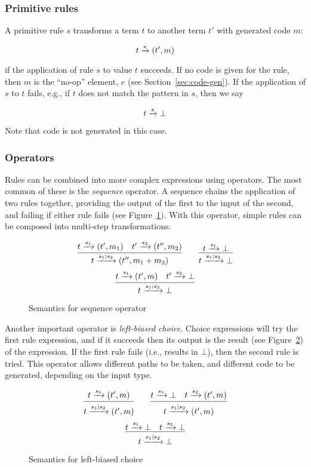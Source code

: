 \subsubsection{Primitive rules}

A primitive rule $s$ transforms a term $t$ to another term $t'$ with generated code $m$:

\[
t \xrightarrow{s} (t',m)
\]

if the application of rule $s$ to value $t$ succeeds. If no code is given for the rule, then $m$ is the ``no-op'' element, $e$ (see Section~\ref{sec:code-gen}). If the application of $s$ to $t$ fails, e.g., if $t$ does not match the pattern in $s$, then we say

\[
t \xrightarrow{s} \bot
\]

Note that code is not generated in this case.

\subsubsection{Operators}

Rules can be combined into more complex expressions using operators. The most common of these is the \emph{sequence} operator. A sequence chains the application of two rules together, providing the output of the first to the input of the second, and failing if either rule fails (see Figure~\ref{semantics:sequence}). With this operator, simple rules can be composed into multi-step transformations.

\begin{figure}[ht]
\[
\infer{t \arr{s_1;s_2} (t'',m_1+m_2)}{t \arr{s_1} (t',m_1) \quad t' \arr{s_2} (t'',m_2)}
\qquad 
\infer{t \arr{s_1;s_2} \bot}{t \arr{s_1} \bot}
\]
\[
\infer{t \arr{s_1;s_2} \bot}{t \arr{s_1} (t',m) \quad t' \arr{s_2} \bot}
\]
\caption{Semantics for sequence operator}
\label{semantics:sequence}
\end{figure}

Another important operator is \emph{left-biased choice}. Choice expressions will try the first rule expression, and if it succeeds then its output is the result (see Figure~\ref{semantics:choice}) of the expression. If the first rule fails (i.e., results in $\bot$), then the second rule is tried. This operator allows different paths to be taken, and different code to be generated, depending on the input type.

\begin{figure}[ht]
\[
\infer{t \arr{s_1|s_2} (t',m)}{t \arr{s_1} (t',m)}
\qquad 
\infer{t \arr{s_1|s_2} (t',m)}{t \arr{s_1} \bot \quad t \arr{s_2} (t',m)}
\]
\[
\infer{t \arr{s_1|s_2} \bot}{t \arr{s_1} \bot \quad t \arr{s_2} \bot}
\]
\caption{Semantics for left-biased choice}
\label{semantics:choice}
\end{figure}

